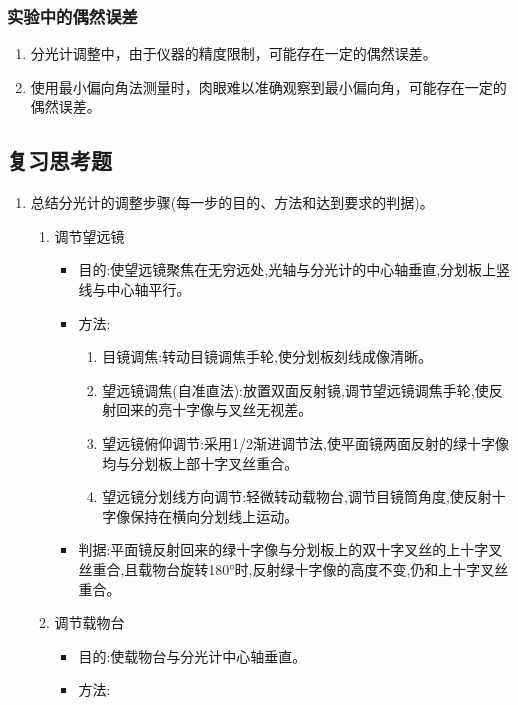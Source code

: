 \documentclass[UTF8]{ctexart}
\begin{document}
\subsubsection{实验中的偶然误差}
\begin{enumerate}
    \item 分光计调整中，由于仪器的精度限制，可能存在一定的偶然误差。
    \item 使用最小偏向角法测量时，肉眼难以准确观察到最小偏向角，可能存在一定的偶然误差。
\end{enumerate}

\subsection{复习思考题}
\begin{enumerate}
    \item 总结分光计的调整步骤(每一步的目的、方法和达到要求的判据)。
    \begin{enumerate}
        \item 调节望远镜
        \begin{itemize}
            \item 目的:使望远镜聚焦在无穷远处,光轴与分光计的中心轴垂直,分划板上竖线与中心轴平行。
            \item 方法:
            \begin{enumerate}
                \item 目镜调焦:转动目镜调焦手轮,使分划板刻线成像清晰。
                \item 望远镜调焦(自准直法):放置双面反射镜,调节望远镜调焦手轮,使反射回来的亮十字像与叉丝无视差。
                \item 望远镜俯仰调节:采用1/2渐进调节法,使平面镜两面反射的绿十字像均与分划板上部十字叉丝重合。
                \item 望远镜分划线方向调节:轻微转动载物台,调节目镜筒角度,使反射十字像保持在横向分划线上运动。
            \end{enumerate}
            \item 判据:平面镜反射回来的绿十字像与分划板上的双十字叉丝的上十字叉丝重合,且载物台旋转180°时,反射绿十字像的高度不变,仍和上十字叉丝重合。
        \end{itemize}
        \item 调节载物台
        \begin{itemize}
            \item 目的:使载物台与分光计中心轴垂直。
            \item 方法:
            \begin{enumerate}

\end{enumerate}
\end{itemize}
\end{enumerate}
\end{enumerate}
\end{document}
